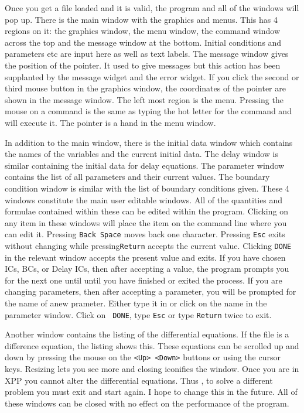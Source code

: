 
Once you get a file loaded and it is valid, the program and all of the 
windows will pop up.  There is the main window with the graphics and menus.  
This has 4 regions on it: the graphics window, the menu window, the command
 window across the top and the message window at the bottom.  Initial 
conditions and parameters etc are input here as well as text labels.  The message 
window gives the position of the pointer.  It used to give messages but this
 action has been supplanted by the message widget and the error widget.  If 
you click the second or third mouse button in the graphics window, the
 coordinates of the pointer are shown in the message window.  The left 
most region is the menu.  Pressing the mouse on a command is the same 
as typing the hot letter for the command and will execute it.  The pointer is 
a hand in the menu window. 


In addition to the main window, there is the initial data window which
 contains the names of the variables and the current initial data.  The 
delay window is similar containing the initial data for delay equations. 
 The parameter window contains the list of all parameters and their current
 values.  The boundary condition window is similar with the list of boundary
 conditions given.  These 4 windows constitute the main user editable windows.
  All of the quantities and formulae contained within these can be edited within
 the program.  Clicking on any item in these windows will place the item on the
 command line where you can edit it.  
 Pressing
{\tt Back Space} moves back one character. 
 Pressing {\tt Esc}  exits without changing while pressing{\tt Return} accepts the current 
value.  Clicking {\tt  DONE} in the relevant window accepts the present value and exits. 
 If you have chosen ICs, BCs, or Delay ICs, then after accepting a value,
 the program prompts you for the next one until until you have finished or 
exited the process.  If you are changing parameters, then after accepting a
 parameter, you will be prompted for the name of anew prameter.  Either type it
 in or click on the name in the parameter window.  Click on {\tt
DONE}, type {\tt Esc} or
 type {\tt Return}  twice to exit.  


Another window contains the listing of the differential equations. If
 the file is a difference equation, the listing shows this.  These equations 
can be scrolled up and down by pressing the mouse on the {\tt <Up> <Down>} buttons
 or using the cursor keys. Resizing lets you see more and closing iconifies the
 window. Once you are in XPP you cannot alter the differential equations.  Thus
, to solve a different problem you must exit and start again.  I hope to change 
this in the future.  All of these windows can be closed with no effect on the
 performance of the program.   

